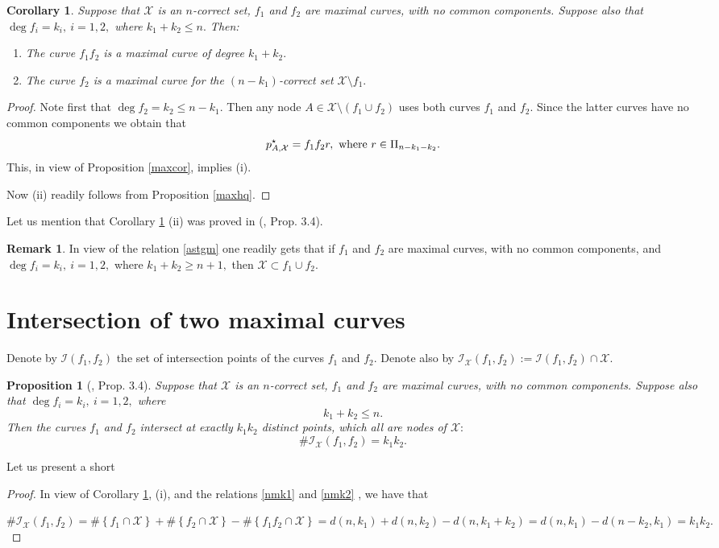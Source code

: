 \documentclass[a4paper,12pt]{article}
\newtheorem{proposition}[lemma]{Proposition}
\newtheorem{corollary}[lemma]{Corollary}
\theoremstyle{definition}
\newtheorem{remark}[lemma]{Remark}
\numberwithin{equation}{section}
\numberwithin{figure}{section}
\newcommand{\Iset}{\mathcal{I}}
\newcommand{\Xset}{\mathcal{X}}
\begin{document}
\begin{corollary}\label{maxtim2} Suppose that $\Xset$ is an $n$-correct set, $f_1$ and $f_2$ are
maximal curves, with no common components. Suppose also that  $\deg f_i=k_i,\ i=1,2,$ where $k_1+k_2\le n.$ Then: 
\begin{enumerate}
\item
The curve $f_1f_2$ is a maximal curve of degree $k_1+k_2.$
\item
The curve $f_2$ is a maximal curve for the $(n-k_1)$-correct set $\Xset\setminus f_1.$
\end{enumerate}
\end{corollary}
\begin{proof}
Note first that $\deg f_2 =k_2\le n-k_1.$ Then any node $A\in \Xset\setminus (f_1\cup f_2)$ uses both curves $f_1$ and $f_2.$ Since the latter curves have no common components we obtain that
\begin{equation}\label{astgm}p_{A,\Xset}^\star = f_1 f_2 r, \ \hbox{where}\ r\in\Pi_{n-k_1-k_2}.\end{equation}
This, in view of  Proposition \ref{maxcor}, implies (i).

Now (ii) readily follows from Proposition \ref{maxhq}.
\end{proof} Let us mention that Corollary \ref{maxtim2} (ii) was proved in (\cite{Raf}, Prop. 3.4).
\begin{remark} \label{rem} In view of the relation \eqref{astgm} one readily gets that if  $f_1$ and $f_2$ are
maximal curves, with no common components, and  $\deg f_i=k_i,\ i=1,2,$ where $k_1+k_2\ge n+1,$ then $\Xset\subset f_1\cup f_2.$
\end{remark}
 \section{Intersection of two maximal curves}
Denote by $\Iset(f_1,f_2)$ the set of intersection points of the curves $f_1$ and $f_2.$
Denote also by $\Iset_\Xset(f_1,f_2):=\Iset(f_1,f_2)\cap \Xset.$

 
\begin{proposition}[\cite{Raf}, Prop. 3.4]\label{prop5}
Suppose that $\Xset$ is an $n$-correct set, $f_1$ and $f_2$ are
maximal curves, with no common components. Suppose also that  $\deg f_i=k_i,\ i=1,2,$ where 
\begin{equation} \label{k1k2+} k_1+k_2\le n.\end{equation}  
Then the curves $f_1$ and $f_2$ intersect at exactly $k_1k_2$ distinct points, which all are nodes of $\Xset:$
$$\#\Iset_\Xset(f_1,f_2) =k_1k_2.$$
\end{proposition}
Let us present a short
\begin{proof} In view of Corollary \ref{maxtim2}, (i), and the relations \eqref{nmk1} and \eqref{nmk2} , we have that

\noindent $\#\Iset_\Xset(f_1,f_2)=\#\left\{f_1\cap \Xset\right\}+\#\left\{f_2\cap \Xset\right\}-\#\left\{f_1f_2\cap \Xset\right\} = d(n,k_1)+d(n,k_2)-d(n,k_1+k_2)=d(n,k_1)-d(n-k_2,k_1)= k_1 k_2.$
\end{proof}
\end{document}

